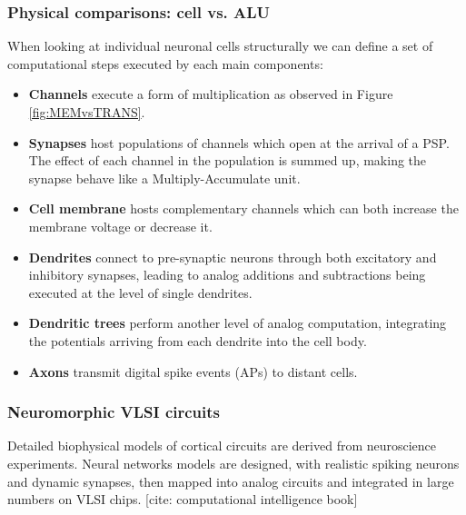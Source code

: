 \documentclass[main]{subfiles}
\begin{document}
\subsubsection{Physical comparisons: cell vs. ALU}
When looking at individual neuronal cells structurally we can define a set of computational steps executed by each main components:

\begin{itemize}
    \item \textbf{Channels} execute a form of multiplication as observed in Figure \ref{fig:MEMvsTRANS}.
    \item \textbf{Synapses} host populations of channels which open at the arrival of a PSP. The effect of each channel in the population is summed up, making the synapse behave like a Multiply-Accumulate unit.
    \item \textbf{Cell membrane} hosts complementary channels which can both increase the membrane voltage or decrease it.
    \item \textbf{Dendrites} connect to pre-synaptic neurons through both excitatory and inhibitory synapses, leading to analog additions and subtractions being executed at the level of single dendrites.
    \item \textbf{Dendritic trees} perform another level of analog computation, integrating the potentials arriving from each dendrite into the cell body.
    \item \textbf{Axons} transmit digital spike events (APs) to distant cells. 
\end{itemize}{}

\subsubsection{Neuromorphic VLSI circuits}

Detailed biophysical models of cortical circuits are derived from neuroscience experiments. Neural networks models are designed, with realistic spiking neurons and dynamic synapses, then mapped into analog circuits and integrated in large numbers on VLSI chips. [cite: computational intelligence book] 
\end{document}
